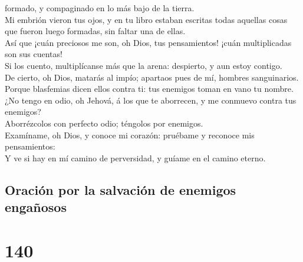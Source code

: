 formado, y compaginado en lo más bajo de la tierra.\\
 Mi embrión vieron tus ojos, y en tu libro estaban escritas
todas aquellas cosas que fueron luego formadas, sin faltar una de
ellas.\\
 Así que ¡cuán preciosos me son, oh Dios, tus pensamientos!
¡cuán multiplicadas son sus cuentas!\\
 Si los cuento, multiplícanse más que la arena: despierto,
y aun estoy contigo.\\
 De cierto, oh Dios, matarás al impío; apartaos pues de mí,
hombres sanguinarios.\\
 Porque blasfemias dicen ellos contra ti: tus enemigos
toman en vano tu nombre.\\
 ¿No tengo en odio, oh Jehová, á los que te aborrecen, y me
conmuevo contra tus enemigos?\\
 Aborrézcolos con perfecto odio; téngolos por enemigos.\\
 Examíname, oh Dios, y conoce mi corazón: pruébame y
reconoce mis pensamientos:\\
 Y ve si hay en mí camino de perversidad, y guíame en el
camino eterno.

\hypertarget{oraciuxf3n-por-la-salvaciuxf3n-de-enemigos-engauxf1osos}{%
\subsection{Oración por la salvación de enemigos
engañosos}\label{oraciuxf3n-por-la-salvaciuxf3n-de-enemigos-engauxf1osos}}

\hypertarget{section-139}{%
\section{140}\label{section-139}}

